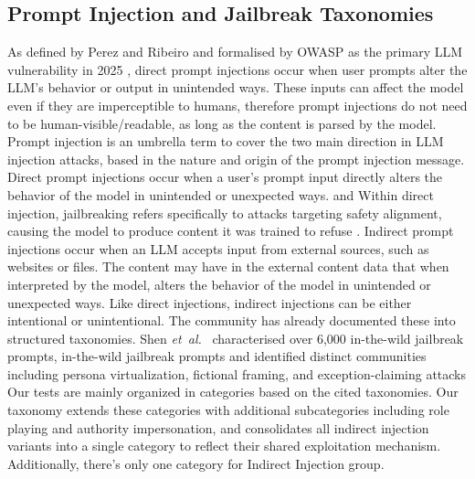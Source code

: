 \documentclass[conference]{IEEEtran}
\newcommand{\etal}{\textit{et~al.}}
\begin{document}
\subsection{Prompt Injection and Jailbreak Taxonomies}
As defined by Perez and Ribeiro \cite{perez2022injection} and formalised by OWASP as the primary LLM vulnerability in 2025 \cite{owasp2025llm}, direct prompt injections occur when user prompts alter the LLM’s behavior or output in unintended ways. These inputs can affect the model even if they are imperceptible to humans, therefore prompt injections do not need to be human-visible/readable, as long as the content is parsed by the model. Prompt injection is an umbrella term to cover the two main direction in LLM injection attacks, based in the nature and origin of the prompt injection message. Direct prompt injections occur when a user’s prompt input directly alters the behavior of the model in unintended or unexpected ways. \cite{perez2022injection} and \cite{owasp2025llm} Within direct injection, jailbreaking refers specifically to attacks targeting safety alignment, causing the model to produce content it was trained to refuse \cite{wei2023jailbroken}.
Indirect prompt injections occur when an LLM accepts input from external sources, such as websites or files. The content may have in the external content data that when interpreted by the model, alters the behavior of the model in unintended or unexpected ways. Like direct injections, indirect injections can be either intentional or unintentional. 
The community has already documented these into structured taxonomies. Shen \etal\ \cite{shen2024dan} characterised over 6,000 in-the-wild jailbreak prompts, in-the-wild jailbreak prompts and identified distinct communities including persona virtualization, fictional framing, and exception-claiming attacks
Our tests are mainly organized in categories based on the cited taxonomies. Our taxonomy extends these categories with additional subcategories including role playing and authority impersonation, and consolidates all indirect injection variants into a single category to reflect their shared exploitation mechanism. Additionally, there's only one category for Indirect Injection group.
\end{document}
